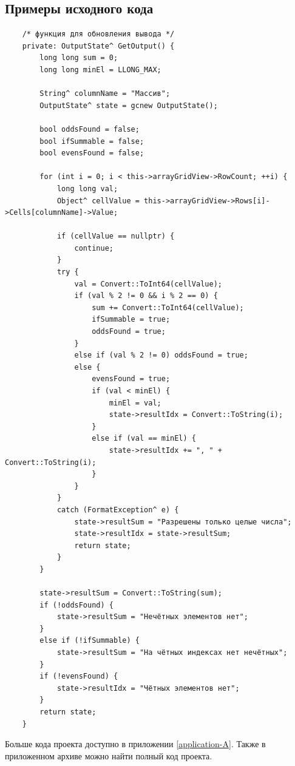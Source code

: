 \subsection{Примеры исходного кода}
\begin{verbatim}
	/* функция для обновления вывода */
	private: OutputState^ GetOutput() {
		long long sum = 0;
		long long minEl = LLONG_MAX;

		String^ columnName = "Массив";
		OutputState^ state = gcnew OutputState();

		bool oddsFound = false;
		bool ifSummable = false;
		bool evensFound = false;

		for (int i = 0; i < this->arrayGridView->RowCount; ++i) {
			long long val;
			Object^ cellValue = this->arrayGridView->Rows[i]->Cells[columnName]->Value;

			if (cellValue == nullptr) {
				continue;
			}
			try {
				val = Convert::ToInt64(cellValue);
				if (val % 2 != 0 && i % 2 == 0) {
					sum += Convert::ToInt64(cellValue);
					ifSummable = true;
					oddsFound = true;
				}
				else if (val % 2 != 0) oddsFound = true;
				else {
					evensFound = true;
					if (val < minEl) {
						minEl = val;
						state->resultIdx = Convert::ToString(i);
					}
					else if (val == minEl) {
						state->resultIdx += ", " + Convert::ToString(i);
					}
				}
			}
			catch (FormatException^ e) {
				state->resultSum = "Разрешены только целые числа";
				state->resultIdx = state->resultSum;
				return state;
			}
		}

		state->resultSum = Convert::ToString(sum);
		if (!oddsFound) {
			state->resultSum = "Нечётных элементов нет";
		}
		else if (!ifSummable) {
			state->resultSum = "На чётных индексах нет нечётных";
		}
		if (!evensFound) {
			state->resultIdx = "Чётных элементов нет";
		}
		return state;
	}
\end{verbatim}

Больше кода проекта доступно в приложении \ref{application-A}. Также в приложенном архиве можно найти полный код проекта.